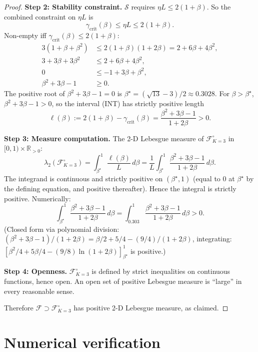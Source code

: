 \documentclass[11pt]{article}
\theoremstyle{definition}
\theoremstyle{remark}
\begin{document}
\begin{proof}
\textbf{Step 2: Stability constraint.} $\mathcal{S}$ requires $\eta L \leq 2(1+\beta)$. So the combined constraint on $\eta L$ is
\begin{equation}
  \gamma_{\mathrm{crit}}(\beta) \leq \eta L \leq 2(1+\beta). \tag{INT}
\end{equation}
Non-empty iff $\gamma_{\mathrm{crit}}(\beta) \leq 2(1+\beta)$:
\begin{align*}
  3(1+\beta+\beta^2) &\leq 2(1+\beta)(1+2\beta) = 2 + 6\beta + 4\beta^2,\\
  3 + 3\beta + 3\beta^2 &\leq 2 + 6\beta + 4\beta^2,\\
  0 &\leq -1 + 3\beta + \beta^2,\\
  \beta^2 + 3\beta - 1 &\geq 0.
\end{align*}
The positive root of $\beta^2 + 3\beta - 1 = 0$ is $\beta^\star = (\sqrt{13} - 3)/2 \approx 0.3028$. For $\beta > \beta^\star$, $\beta^2 + 3\beta - 1 > 0$, so the interval (INT) has strictly positive length
\[
  \ell(\beta) := 2(1+\beta) - \gamma_{\mathrm{crit}}(\beta) = \frac{\beta^2 + 3\beta - 1}{1 + 2\beta} > 0.
\]

\textbf{Step 3: Measure computation.} The 2-D Lebesgue measure of $\mathcal{F}_{K=3}^\circ$ in $[0,1)\times \mathbb{R}_{>0}$:
\[
  \lambda_2(\mathcal{F}_{K=3}^\circ) = \int_{\beta^\star}^1 \frac{\ell(\beta)}{L}\, d\beta = \frac{1}{L}\int_{\beta^\star}^1 \frac{\beta^2 + 3\beta - 1}{1 + 2\beta}\, d\beta.
\]
The integrand is continuous and strictly positive on $(\beta^\star, 1)$ (equal to $0$ at $\beta^\star$ by the defining equation, and positive thereafter). Hence the integral is strictly positive. Numerically:
\[
  \int_{\beta^\star}^1 \frac{\beta^2 + 3\beta - 1}{1 + 2\beta}\, d\beta = \int_{0.303}^1 \frac{\beta^2 + 3\beta - 1}{1 + 2\beta}\, d\beta > 0.
\]
(Closed form via polynomial division: $(\beta^2 + 3\beta - 1)/(1 + 2\beta) = \beta/2 + 5/4 - (9/4)/(1+2\beta)$, integrating: $[\beta^2/4 + 5\beta/4 - (9/8)\ln(1+2\beta)]_{\beta^\star}^1$ is positive.)

\textbf{Step 4: Openness.} $\mathcal{F}_{K=3}^\circ$ is defined by strict inequalities on continuous functions, hence open. An open set of positive Lebesgue measure is ``large'' in every reasonable sense.

Therefore $\mathcal{F} \supset \mathcal{F}_{K=3}^\circ$ has positive 2-D Lebesgue measure, as claimed.
\end{proof}

\section{Numerical verification}
\label{sec:numerical}
\end{document}
